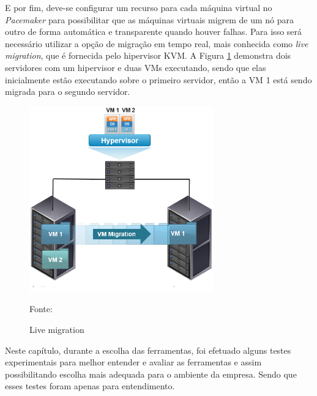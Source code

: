 E por fim, deve-se configurar um recurso para cada máquina virtual no \textit{Pacemaker} para possibilitar que as
máquinas virtuais migrem de um nó para outro de forma automática e transparente quando houver falhas. Para isso será necessário utilizar a 
opção de migração em tempo real, mais conhecida como \textit{live migration}, que é fornecida pelo hipervisor \ac{KVM}.
A Figura \ref{fig:vms_migration} demonstra dois servidores com um hipervisor e duas \ac{VM}s executando, sendo que elas inicialmente estão 
executando sobre o primeiro servidor, então a \ac{VM} 1 está sendo migrada para o segundo servidor.


\begin{figure}[h!]
 \centering
 \includegraphics[width=300px]{img/vms_migration.eps}
 \caption{Live migration}
 Fonte: \citet{spaniol2015}
 \label{fig:vms_migration}
\end{figure}

Neste capítulo, durante a escolha das ferramentas, foi efetuado alguns testes experimentais para melhor entender e avaliar as ferramentas 
e assim possibilitando escolha mais adequada para o ambiente da empresa. Sendo que esses testes foram apenas para entendimento.


